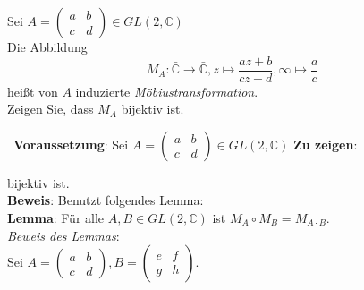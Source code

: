 \begin{assignment}
  Sei \( A = \begin{pmatrix}
    a & b \\
    c & d 
  \end{pmatrix} \in GL(2,\mathbb{C}) \) \\
  Die Abbildung
  \begin{equation*}
    M_A : \bar{\mathbb{C}} \to \bar{\mathbb{C}}, z \mapsto \frac{az + b}{cz + d}, \infty \mapsto \frac{a}{c}
  \end{equation*}
  heißt von \( A \) induzierte \emph{Möbiustransformation}. \\
  Zeigen Sie, dass \( M_A \) bijektiv ist.
\end{assignment}
\begin{solution}
  \
  \textbf{Voraussetzung}: Sei \( A = \begin{pmatrix}
    a & b \\
    c & d 
  \end{pmatrix} \in GL(2,\mathbb{C}) \) 
  \textbf{Zu zeigen}:
  
  bijektiv ist. \\
  \textbf{Beweis}: Benutzt folgendes Lemma: \\
  \textbf{Lemma}: Für alle \( A,B \in GL(2, \mathbb{C}) \) ist \( M_A \circ M_B = M_{A \cdot B} \). \\
  \emph{Beweis des Lemmas}: \\
  Sei \( A = \left(\begin{smallmatrix}
    a & b \\
    c & d
  \end{smallmatrix} \right), B = \left(\begin{smallmatrix}
    e & f \\
    g & h
  \end{smallmatrix} \right) \). \\
  
  

\end{solution}
